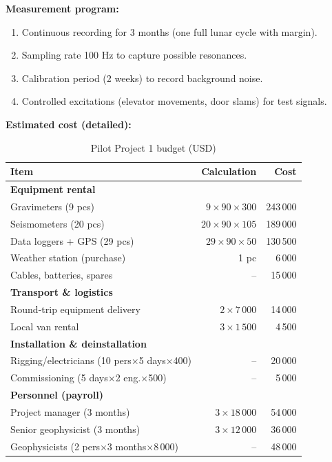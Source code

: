 \documentclass[12pt,a4paper]{article}
\theoremstyle{remark}
\begin{document}
	\textbf{Measurement program:}
	\begin{enumerate}
		\item Continuous recording for 3 months (one full lunar cycle with margin).
		\item Sampling rate 100 Hz to capture possible resonances.
		\item Calibration period (2 weeks) to record background noise.
		\item Controlled excitations (elevator movements, door slams) for test signals.
	\end{enumerate}
	
	\textbf{Estimated cost (detailed):}
	\begin{table}[htbp]
		\centering
		\caption{Pilot Project 1 budget (USD)}
		\label{tab:budget-building}
		\small
		\begin{tabular}{lrr}
			\toprule
			\textbf{Item} & \textbf{Calculation} & \textbf{Cost} \\
			\midrule
			\multicolumn{3}{l}{\textbf{Equipment rental}} \\
			Gravimeters (9 pcs) & $9\times90\times300$ & 243\,000 \\
			Seismometers (20 pcs) & $20\times90\times105$ & 189\,000 \\
			Data loggers + GPS (29 pcs) & $29\times90\times50$ & 130\,500 \\
			Weather station (purchase) & 1 pc & 6\,000 \\
			Cables, batteries, spares & – & 15\,000 \\
			\multicolumn{3}{l}{\textbf{Transport \& logistics}} \\
			Round-trip equipment delivery & $2\times7\,000$ & 14\,000 \\
			Local van rental & $3\times1\,500$ & 4\,500 \\
			\multicolumn{3}{l}{\textbf{Installation \& deinstallation}} \\
			Rigging/electricians (10 pers$\times$5 days$\times$400) & – & 20\,000 \\
			Commissioning (5 days$\times$2 eng.$\times$500) & – & 5\,000 \\
			\multicolumn{3}{l}{\textbf{Personnel (payroll)}} \\
			Project manager (3 months) & $3\times18\,000$ & 54\,000 \\
			Senior geophysicist (3 months) & $3\times12\,000$ & 36\,000 \\
			Geophysicists (2 pers$\times$3 months$\times$8\,000) & – & 48\,000 \\

\end{tabular}
\end{table}
\end{document}

